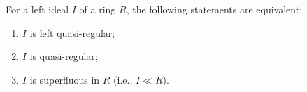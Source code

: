 For a left ideal $I$ of a ring $R$, the following statements are equivalent:
\begin{enumerate}
\item[(a)] $I$ is left quasi-regular;
\item[(b)] $I$ is quasi-regular;
\item[(c)] $I$ is superfluous in $R$ (i.e., $I \ll R$).
\end{enumerate}
